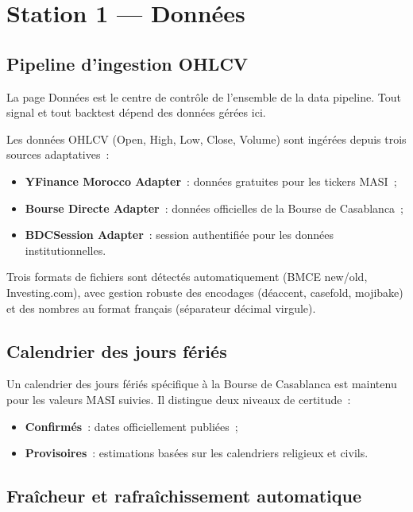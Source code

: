 \section{Station 1 --- Données}
\label{sec:station_data}

\subsection{Pipeline d'ingestion OHLCV}

La page Données est le centre de contrôle de l'ensemble de la data pipeline.
Tout signal et tout backtest dépend des données gérées ici.

Les données OHLCV (Open, High, Low, Close, Volume) sont ingérées depuis trois
sources adaptatives~:

\begin{itemize}
    \item \textbf{YFinance Morocco Adapter}~: données gratuites pour les tickers MASI~;
    \item \textbf{Bourse Directe Adapter}~: données officielles de la Bourse de Casablanca~;
    \item \textbf{BDCSession Adapter}~: session authentifiée pour les données institutionnelles.
\end{itemize}

Trois formats de fichiers sont détectés automatiquement (BMCE new/old, Investing.com),
avec gestion robuste des encodages (déaccent, casefold, mojibake) et des nombres
au format français (séparateur décimal virgule).

\subsection{Calendrier des jours fériés}

Un calendrier des jours fériés spécifique à la Bourse de Casablanca est maintenu
pour les valeurs MASI suivies. Il distingue deux niveaux de certitude~:
\begin{itemize}
    \item \textbf{Confirmés}~: dates officiellement publiées~;
    \item \textbf{Provisoires}~: estimations basées sur les calendriers religieux et civils.
\end{itemize}

\subsection{Fraîcheur et rafraîchissement automatique}

